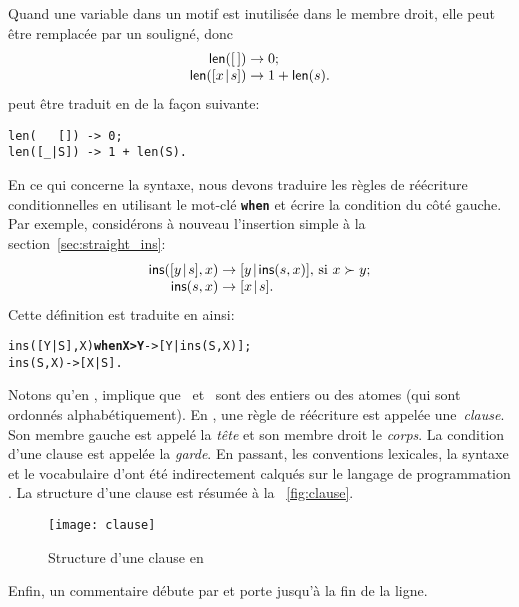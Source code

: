 Quand une variable dans un motif est inutilisée dans le membre droit,
elle peut être remplacée par un souligné, donc
\begin{equation*}
\begin{array}{@{}r@{\;}l@{\;}l@{}}
\fun{len}(\el)         & \rightarrow & 0;\\
\fun{len}(\cons{x}{s}) & \rightarrow & 1 + \fun{len}(s).
\end{array}
\end{equation*}
peut être traduit en \Erlang de la façon suivante:
\begin{verbatim}
len(   []) -> 0;
len([_|S]) -> 1 + len(S).
\end{verbatim}
En ce qui concerne la syntaxe, nous devons traduire les règles de
réécriture conditionnelles en utilisant le mot-clé
\texttt{\textbf{when}} et écrire la condition du côté gauche. Par
exemple, considérons à nouveau l'insertion simple à la
section~\ref{sec:straight_ins}:
\begin{equation*}
\begin{array}{@{}r@{\;}l@{\;}l@{}}
\fun{ins}(\cons{y}{s},x) & \rightarrow &
\cons{y}{\fun{ins}(s,x)}, \,\text{si \(x \succ y\)};\\
\fun{ins}(s,x) & \rightarrow & \cons{x}{s}.
\end{array}
\end{equation*}
Cette définition est traduite en \Erlang ainsi:
\begin{alltt}
ins([Y|S],X) \textbf{when X > Y} -> [Y|ins(S,X)];
ins(    S,X)            -> [X|S].
\end{alltt}
Notons qu'en \Erlang,  implique que
~et~ sont des entiers ou des atomes (qui sont
ordonnés alphabétiquement). En \Erlang, une règle de réécriture est
appelée une~\emph{clause}. Son membre gauche est appelé la \emph{tête}
et son membre droit le \emph{corps}. La condition d'une clause est
appelée la \emph{garde}. En passant, les conventions lexicales, la
syntaxe et le vocabulaire d'\Erlang ont été indirectement calqués sur
le langage de programmation \Prolog
\citep{SterlingShapiro_1994,Bratko_2000}. La structure d'une clause
\Erlang est résumée à la \fig~\vref{fig:clause}.
\begin{figure}[t]
\centering
\texttt{[image: clause]}
\caption{Structure d'une clause en \Erlang\label{fig:clause}}
\end{figure}

Enfin, un commentaire débute par \erlcode{\%} et porte jusqu'à la fin
de la ligne.


